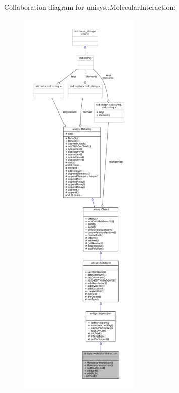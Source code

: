 Collaboration diagram for unisys\-:\-:Molecular\-Interaction\-:
\nopagebreak
\begin{figure}[H]
\begin{center}
\leavevmode
\includegraphics[height=550pt]{classunisys_1_1MolecularInteraction__coll__graph}
\end{center}
\end{figure}
